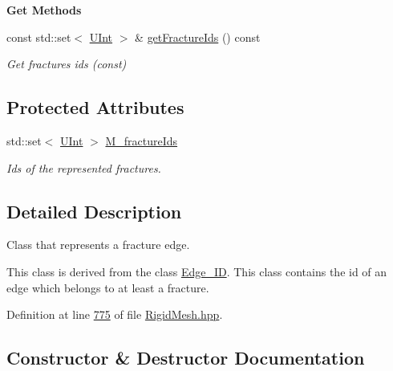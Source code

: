 \begin{Indent}{\bf Get Methods}\par
\begin{DoxyCompactItemize}
\item 
const std\+::set$<$ \hyperlink{namespaceFVCode3D_a4bf7e328c75d0fd504050d040ebe9eda}{U\+Int} $>$ \& \hyperlink{classFVCode3D_1_1Rigid__Mesh_1_1Fracture__Edge_af9ba908f4ca3fe7c68a3892252ea51b8}{get\+Fracture\+Ids} () const 
\begin{DoxyCompactList}\small\item\em Get fractures ids (const) \end{DoxyCompactList}\end{DoxyCompactItemize}
\end{Indent}
\subsection*{Protected Attributes}
\begin{DoxyCompactItemize}
\item 
std\+::set$<$ \hyperlink{namespaceFVCode3D_a4bf7e328c75d0fd504050d040ebe9eda}{U\+Int} $>$ \hyperlink{classFVCode3D_1_1Rigid__Mesh_1_1Fracture__Edge_a1a498306a94e881c238467af5c99cb57}{M\+\_\+fracture\+Ids}
\begin{DoxyCompactList}\small\item\em Ids of the represented fractures. \end{DoxyCompactList}\end{DoxyCompactItemize}


\subsection{Detailed Description}
Class that represents a fracture edge. 

This class is derived from the class \hyperlink{classFVCode3D_1_1Rigid__Mesh_1_1Edge__ID}{Edge\+\_\+\+ID}. This class contains the id of an edge which belongs to at least a fracture. 

Definition at line \hyperlink{RigidMesh_8hpp_source_l00775}{775} of file \hyperlink{RigidMesh_8hpp_source}{Rigid\+Mesh.\+hpp}.



\subsection{Constructor \& Destructor Documentation}
